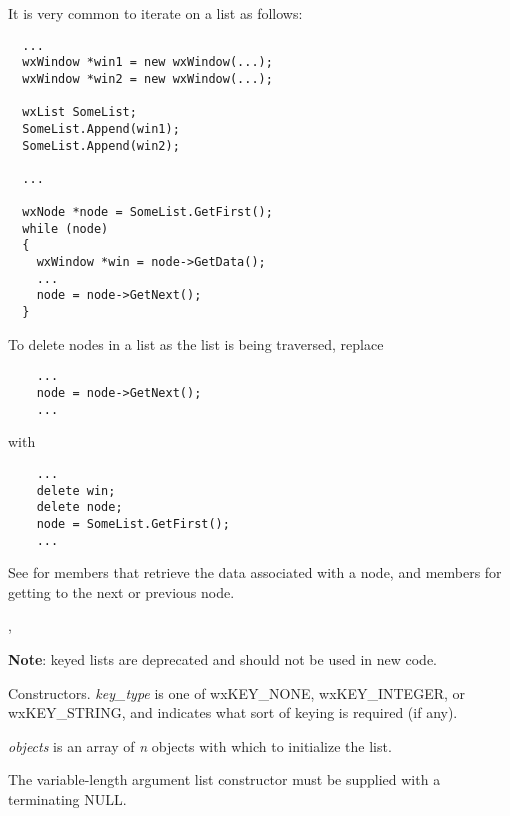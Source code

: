
It is very common to iterate on a list as follows:

\begin{verbatim}
  ...
  wxWindow *win1 = new wxWindow(...);
  wxWindow *win2 = new wxWindow(...);

  wxList SomeList;
  SomeList.Append(win1);
  SomeList.Append(win2);

  ...

  wxNode *node = SomeList.GetFirst();
  while (node)
  {
    wxWindow *win = node->GetData();
    ...
    node = node->GetNext();
  }
\end{verbatim}

To delete nodes in a list as the list is being traversed, replace

\begin{verbatim}
    ...
    node = node->GetNext();
    ...
\end{verbatim}

with

\begin{verbatim}
    ...
    delete win;
    delete node;
    node = SomeList.GetFirst();
    ...
\end{verbatim}

See  for members that retrieve the data associated with a node, and
members for getting to the next or previous node.


,


\label{wxlistctor}




{\bf Note}: keyed lists are deprecated and should not be used in new code.


Constructors. {\it key\_type} is one of wxKEY\_NONE, wxKEY\_INTEGER, or wxKEY\_STRING,
and indicates what sort of keying is required (if any).

{\it objects} is an array of {\it n} objects with which to initialize the list.

The variable-length argument list constructor must be supplied with a
terminating NULL.

